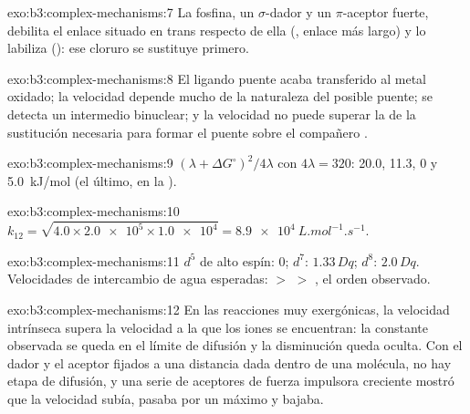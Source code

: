 \begin{solution}{exo:b3:complex-mechanisms:7}
La fosfina, un $\sigma$-dador y un $\pi$-aceptor fuerte, debilita el enlace situado en trans respecto de ella (, enlace más largo) y lo labiliza (): ese cloruro se
sustituye primero.
\end{solution}

\begin{solution}{exo:b3:complex-mechanisms:8}
El ligando puente acaba transferido al metal oxidado; la velocidad depende
mucho de la naturaleza del posible puente; se detecta un intermedio binuclear;
y la velocidad no puede superar la de la sustitución necesaria para formar el
puente sobre el compañero .
\end{solution}

\begin{solution}{exo:b3:complex-mechanisms:9}
$(\lambda + \Delta G^\circ)^2/4\lambda$ con $4\lambda = 320$: 20.0, 11.3, 0 y \qty{5.0}{kJ/mol} (el último, en la ).
\end{solution}

\begin{solution}{exo:b3:complex-mechanisms:10}
$k_{12} = \sqrt{4.0 \times \num{2.0e5} \times \num{1.0e4}} = \qty{8.9e4}{L.mol^{-1}.s^{-1}}$.
\end{solution}

\begin{solution}{exo:b3:complex-mechanisms:11}
$d^5$ de alto espín: 0; $d^7$: $1.33\,Dq$; $d^8$: $2.0\,Dq$. Velocidades de intercambio de agua esperadas:  $>$  $>$
, el orden observado.
\end{solution}

\begin{solution}{exo:b3:complex-mechanisms:12}
En las reacciones muy exergónicas, la velocidad intrínseca supera la velocidad a la que los iones
se encuentran: la constante observada se queda en el límite de difusión y la disminución queda
oculta. Con el dador y el aceptor fijados a una distancia dada dentro de una molécula, no
hay etapa de difusión, y una serie de aceptores de fuerza impulsora creciente
mostró que la velocidad subía, pasaba por un máximo y bajaba.
\end{solution}

